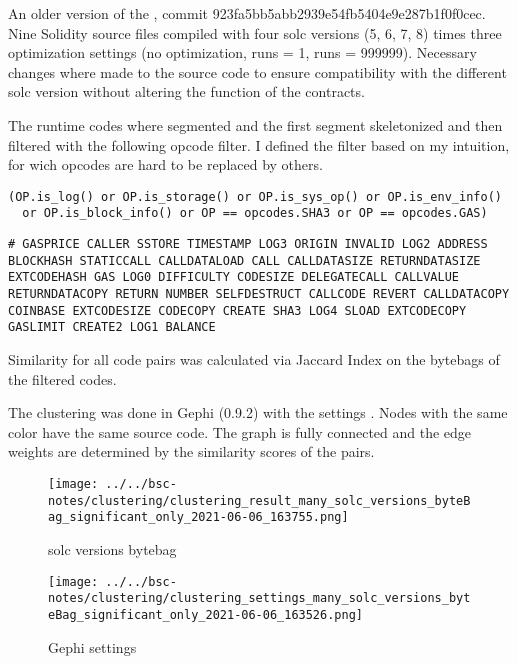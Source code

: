 \documentclass[../main.tex]{subfiles}
\begin{document}
An older version of the , commit 923fa5bb5abb2939e54fb5404e9e287b1f0f0cec.
Nine Solidity source files compiled with four solc versions (5, 6, 7, 8) times three optimization
settings (no optimization, runs = 1, runs = 999999).
Necessary changes where made to the source code to ensure compatibility with the different solc
version without altering the function of the contracts.

The runtime codes where segmented and the first segment skeletonized and then filtered with the following opcode filter. I defined the filter based on my intuition, for wich opcodes are hard to be replaced by others.
\begin{lstlisting}[style=pymd]
(OP.is_log() or OP.is_storage() or OP.is_sys_op() or OP.is_env_info()
  or OP.is_block_info() or OP == opcodes.SHA3 or OP == opcodes.GAS)
\end{lstlisting}
\begin{lstlisting}[style=pysm]
# GASPRICE CALLER SSTORE TIMESTAMP LOG3 ORIGIN INVALID LOG2 ADDRESS BLOCKHASH STATICCALL CALLDATALOAD CALL CALLDATASIZE RETURNDATASIZE EXTCODEHASH GAS LOG0 DIFFICULTY CODESIZE DELEGATECALL CALLVALUE RETURNDATACOPY RETURN NUMBER SELFDESTRUCT CALLCODE REVERT CALLDATACOPY COINBASE EXTCODESIZE CODECOPY CREATE SHA3 LOG4 SLOAD EXTCODECOPY GASLIMIT CREATE2 LOG1 BALANCE
\end{lstlisting}

Similarity for all code pairs was calculated via Jaccard Index on the bytebags of the filtered codes.

The clustering  was done in Gephi (0.9.2) with the settings .
Nodes with the same color have the same source code.
The graph is fully connected and the edge weights are determined by the similarity scores of the pairs.

\begin{figure*}[ht!]
  \texttt{[image: ../../bsc-notes/clustering/clustering\_result\_many\_solc\_versions\_byteBag\_significant\_only\_2021-06-06\_163755.png]}
  \caption{solc versions bytebag}
  \label{fig:solc_bytebag_cluster}
\end{figure*}

\begin{figure*}[ht!]
  \centering
  \texttt{[image: ../../bsc-notes/clustering/clustering\_settings\_many\_solc\_versions\_byteBag\_significant\_only\_2021-06-06\_163526.png]}
  \caption{Gephi settings}
  \label{fig:solc_bytebag_cluster_settings}
\end{figure*}
\end{document}
